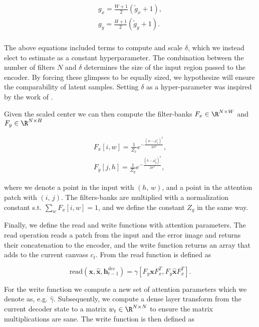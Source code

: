 \begin{align}
g_x = \frac{W +1 }{2} (\tilde{g}_x +1 ), \\
g_y = \frac{H +1 }{2} (\tilde{g}_y +1 ). \\
\end{align}

\noindent The above equations included terms to compute and scale $\delta$, which we instead elect to estimate as a constant hyperparameter. The combination between the number of filters $N$ and $\delta$ determines the size of the input region passed to the encoder. By forcing these glimpses to be equally sized, we hypothesize will ensure the comparability of latent samples. Setting $\delta$ as a hyper-parameter was inspired by the work of \citet{Harris2019}.

Given the scaled center we can then compute the filter-banks $F_x \in \R^{N \times W}$ and $F_y \in \R^{N \times H}$

\begin{align}
F_x [i, w] = \frac{1}{Z_x}e^{-\frac{(w - \mu_x^i)^2}{2\sigma^2}},\label{eq:Fx} \\
F_y [j, h] = \frac{1}{Z_y}e^{-\frac{(h - \mu_y^j)^2}{2\sigma^2}},\label{eq:Fy}
\end{align}

\noindent where we denote a point in the input with $(h,\, w)$, and a point in the attention patch with $(i,\, j)$. The filters-banks are multiplied with a normalization constant s.t. $\sum_w F_x[i, w] = 1$, and we define the constant $Z_y$ in the same way. 

Finally, we define the read and write functions with attention parameters. The read operation reads a patch from the input and the error image and returns their concatenation to the encoder, and the write function returns an array that adds to the current canvass $c_t$. From \citet{Gregor2015} the read function is defined as

\begin{equation}\label{eq:read}
\text{read}(\mathbf{x}, \mathbf{\hat{x}}, \mathbf{h}_{t-1}^{dec}) = \gamma[F_y \mathbf{x} F_x^T, F_y \mathbf{\hat{x}} F_x^T].
\end{equation} 

\noindent For the write function we compute a new set of attention parameters which we denote as, e.g. $\hat{\gamma}$. Subsequently, we compute a dense layer transform from the current decoder state to a matrix $w_t \in \R^{N \times N}$ to ensure the matrix multiplications are sane. The write function is then defined as

